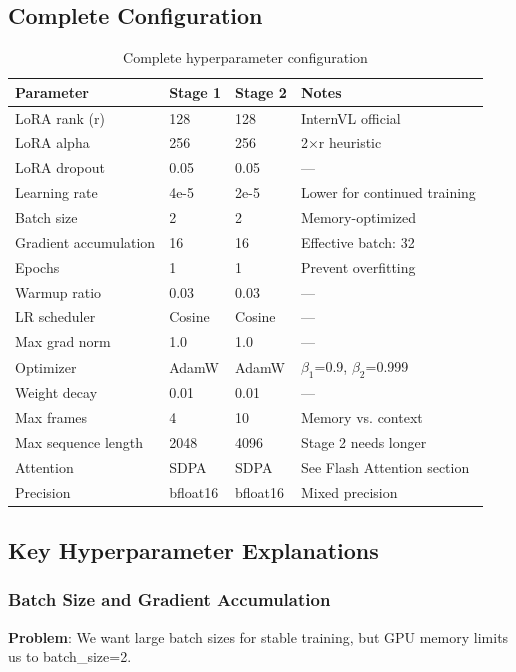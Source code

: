 \documentclass[11pt,a4paper]{article}
\begin{document}
\subsection{Complete Configuration}

\begin{table}[H]
\centering
\begin{tabular}{@{}llll@{}}
\toprule
\textbf{Parameter} & \textbf{Stage 1} & \textbf{Stage 2} & \textbf{Notes} \\
\midrule
LoRA rank (r) & 128 & 128 & InternVL official \\
LoRA alpha & 256 & 256 & 2$\times$r heuristic \\
LoRA dropout & 0.05 & 0.05 & --- \\
Learning rate & 4e-5 & 2e-5 & Lower for continued training \\
Batch size & 2 & 2 & Memory-optimized \\
Gradient accumulation & 16 & 16 & Effective batch: 32 \\
Epochs & 1 & 1 & Prevent overfitting \\
Warmup ratio & 0.03 & 0.03 & --- \\
LR scheduler & Cosine & Cosine & --- \\
Max grad norm & 1.0 & 1.0 & --- \\
Optimizer & AdamW & AdamW & $\beta_1$=0.9, $\beta_2$=0.999 \\
Weight decay & 0.01 & 0.01 & --- \\
Max frames & 4 & 10 & Memory vs. context \\
Max sequence length & 2048 & 4096 & Stage 2 needs longer \\
Attention & SDPA & SDPA & See Flash Attention section \\
Precision & bfloat16 & bfloat16 & Mixed precision \\
\bottomrule
\end{tabular}
\caption{Complete hyperparameter configuration}
\end{table}

\subsection{Key Hyperparameter Explanations}

\subsubsection{Batch Size and Gradient Accumulation}
\textbf{Problem}: We want large batch sizes for stable training, but GPU memory limits us to batch\_size=2.
\end{document}
